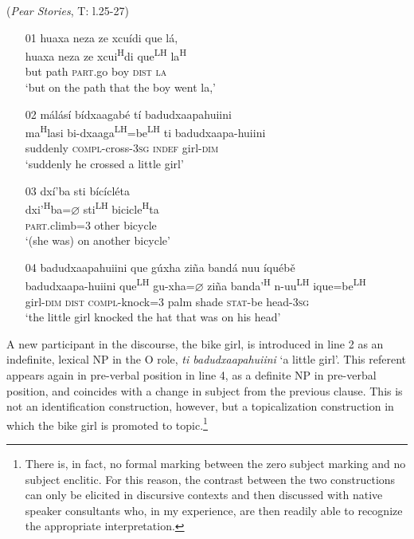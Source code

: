 \ea\label{topicalization1}  (\textit{Pear Stories}, T: l.25-27)
\begin{itemize}
\item[01]
\glll huaxa neza ze xcu\'{i}di que l\'{a},  \\
huaxa neza ze xcui\textsuperscript{H}di que\textsuperscript{LH} la\textsuperscript{H}  \\
but path \textsc{part}.go boy \textsc{dist} \textsc{la}  \\
\glt `but on the path that the boy went la,'


\item[02]
\glll m\'{a}l\'{a}s\'{i} b\'{i}dxaagab\'{e} t\'{i} badudxaapahuiini  \\
ma\textsuperscript{H}lasi bi-dxaaga\textsuperscript{LH}=be\textsuperscript{LH} ti badudxaapa-huiini  \\
suddenly \textsc{compl}-cross-3\textsc{sg} \textsc{indef} girl-\textsc{dim}  \\
\glt `suddenly he crossed a little girl'


\item[03]
\glll dx\'{i}'ba sti b\'{i}c\'{i}cl\'{e}ta  \\
dxi'\textsuperscript{H}ba=$\varnothing$ sti\textsuperscript{LH} bicicle\textsuperscript{H}ta  \\
\textsc{part}.climb=\textsc{3} other bicycle  \\
\glt `(she was) on another bicycle'


\item[04]
\glll badudxaapahuiini que g\'{u}xha zi\~{n}a band\'{a} nuu \'{i}qu\'{e}b\v{e}  \\
badudxaapa-huiini que\textsuperscript{LH} gu-xha=$\varnothing$ zi\~{n}a banda'\textsuperscript{H} n-uu\textsuperscript{LH} ique=be\textsuperscript{LH}  \\
girl-\textsc{dim} \textsc{dist} \textsc{compl}-knock=\textsc{3} palm shade \textsc{stat}-be head-3\textsc{sg}  \\
\glt `the little girl knocked the hat that was on his head' 

\end{itemize}
\z
A new participant in the discourse, the bike girl, is introduced in line 2 as an indefinite, lexical NP in the O role, \textit{ti badudxaapahuiini} `a little girl'. This referent appears again in pre-verbal position in line 4, as a definite NP in pre-verbal position, and coincides with a change in subject from the previous clause. This is not an identification construction, however, but a topicalization construction in which the bike girl is promoted to topic.\footnote{There is, in fact, no formal marking between the zero subject marking and no subject enclitic. For this reason, the contrast between the two constructions can only be elicited in discursive contexts and then discussed with native speaker consultants who, in my experience, are then readily able to recognize the appropriate interpretation.} 

